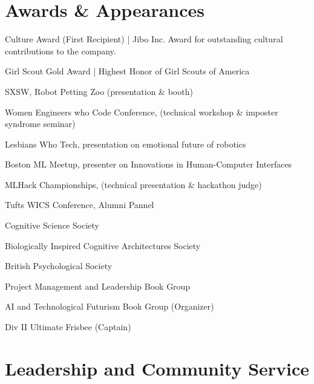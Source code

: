 \documentclass[]{csaund_resume-openfont}
\begin{document}
\section{Awards \& Appearances}
\descript{ }
\begin{tightemize}
\item Culture Award (First Recipient) | Jibo Inc. Award for outstanding cultural contributions to the company.
\item Girl Scout Gold Award | Highest Honor of Girl Scouts of America
\end{tightemize}
\sectionsep

\descript {}
\begin{tightemize}
\item SXSW, Robot Petting Zoo (presentation \& booth)
\item Women Engineers who Code Conference, (technical workshop \& imposter syndrome seminar)
\item Lesbians Who Tech, presentation on emotional future of robotics 
\item Boston ML Meetup, presenter on Innovations in Human-Computer Interfaces
\item MLHack Championships, (technical presentation \& hackathon judge)
\item Tufts WICS Conference, Alumni Pannel 
\end{tightemize}
\sectionsep

\descript{ }
\begin{tightemize}
\item Cognitive Science Society
\item Biologically Inspired Cognitive Architectures Society
\item British Psychological Society
\item Project Management and Leadership Book Group 
\item AI and Technological Futurism Book Group (Organizer)
\item Div II Ultimate Frisbee (Captain)
\end{tightemize}
\sectionsep


\section{Leadership and Community Service}
\end{document}

